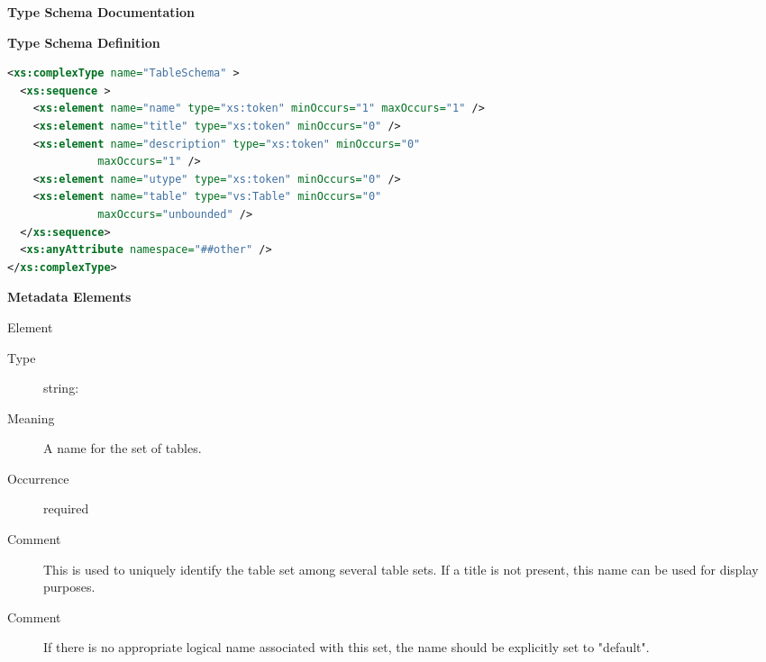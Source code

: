 \documentclass[11pt,a4paper]{ivoa}
\begin{document}
\begin{generated}
\begingroup
      	\renewcommand*\descriptionlabel[1]{%
      	\hbox to 5.5em{\emph{#1}\hfil}}\vspace{2ex}\noindent\textbf{ Type Schema Documentation}


\vspace{1ex}\noindent\textbf{ Type Schema Definition}

\begin{lstlisting}[language=XML,basicstyle=\footnotesize]
<xs:complexType name="TableSchema" >
  <xs:sequence >
    <xs:element name="name" type="xs:token" minOccurs="1" maxOccurs="1" />
    <xs:element name="title" type="xs:token" minOccurs="0" />
    <xs:element name="description" type="xs:token" minOccurs="0"
              maxOccurs="1" />
    <xs:element name="utype" type="xs:token" minOccurs="0" />
    <xs:element name="table" type="vs:Table" minOccurs="0"
              maxOccurs="unbounded" />
  </xs:sequence>
  <xs:anyAttribute namespace="##other" />
</xs:complexType>
\end{lstlisting}

\vspace{0.5ex}\noindent\textbf{ Metadata Elements}

\begingroup\small\begin{bigdescription}\item[Element \xmlel{name}]
\begin{description}
\item[Type] string: 
\item[Meaning] 
               A name for the set of tables.  
             
\item[Occurrence] required
\item[Comment] 
               This is used to uniquely identify the table set among
               several table sets.  If a title is not present, this
               name can be used for display purposes.
             
\item[Comment] 
               If there is no appropriate logical name associated with
               this set, the name should be explicitly set to
               {"}default{"}.  
             


\end{description}
\end{bigdescription}
\end{generated}
\end{document}
